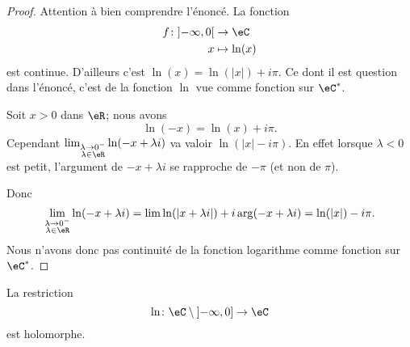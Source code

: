 \begin{proof}
    Attention à bien comprendre l'énoncé. La fonction
    \begin{equation}
        \begin{aligned}
        f\colon \mathopen] -\infty , 0 \mathclose[&\to \eC \\
            x&\mapsto \ln(x) 
        \end{aligned}
    \end{equation}
    est continue. D'ailleurs c'est \( \ln(x)=\ln(| x |)+i\pi\). Ce dont il est question dans l'énoncé, c'est de la fonction \( \ln\) vue comme fonction sur \( \eC^*\).

    Soit \( x>0\) dans \( \eR\); nous avons
    \begin{equation}
        \ln(-x)=\ln(x)+i\pi.
    \end{equation}
    Cependant \( \lim_{\substack{\lambda\to 0^-\\\lambda\in \eR}}\ln(-x+\lambda i) \) va valoir \( \ln(| x |-i\pi)\). En effet lorsque \( \lambda<0\) est petit, l'argument de \( -x+\lambda i\) se rapproche de \( -\pi\) (et non de \( \pi\)).

\begin{center}
   
\end{center}

Donc
\begin{equation}
    \lim_{\substack{\lambda\to 0^-\\\lambda\in \eR}}\ln(-x+\lambda i)=\lim \ln(| x+\lambda i |)+i\arg(-x+\lambda i)=\ln(| x |)-i\pi.
\end{equation}
Nous n'avons donc pas continuité de la fonction logarithme comme fonction sur \( \eC^*\).
\end{proof}

\begin{theorem}     \label{THOooWUXOooYKvLbJ}
    La restriction
    \begin{equation}
        \ln\colon \eC\setminus\mathopen] -\infty , 0 \mathclose]\to \eC 
    \end{equation}
    est holomorphe.
\end{theorem}

